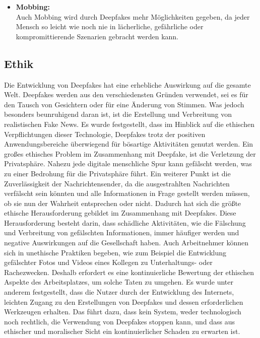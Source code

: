 \begin{itemize}
    \item \textbf{Mobbing:} \\
    Auch Mobbing wird durch Deepfakes mehr Möglichkeiten gegeben, da jeder Mensch so leicht wie noch nie in lächerliche, gefährliche oder kompromittierende Szenarien gebracht werden kann.\cite{ResearchGate}
\end{itemize}

\subsection{Ethik}

Die Entwicklung von Deepfakes hat eine erhebliche Auswirkung auf die gesamte Welt. Deepfakes werden aus den verschiedensten Gründen verwendet, sei es für den Tausch von Gesichtern oder für eine Änderung von Stimmen.\newline
Was jedoch besonders beunruhigend daran ist, ist die Erstellung und Verbreitung von realistischen Fake News. Es wurde festgestellt, dass im Hinblick auf die ethischen Verpflichtungen dieser Technologie, Deepfakes trotz der positiven Anwendungsbereiche überwiegend für bösartige Aktivitäten genutzt werden.\newline
Ein großes ethisches Problem im Zusammenhang mit Deepfake, ist die Verletzung der Privatsphäre. Nahezu jede digitale menschliche Spur kann gefälscht werden, was zu einer Bedrohung für die Privatsphäre führt. Ein weiterer Punkt ist die Zuverlässigkeit der Nachrichtensender, da die ausgestrahlten Nachrichten verfälscht sein könnten und alle Informationen in Frage gestellt werden müssen, ob sie nun der Wahrheit entsprechen oder nicht.\newline
Dadurch hat sich die größte ethische Herausforderung gebildet im Zusammenhang mit Deepfakes. Diese Herausforderung besteht darin, dass schädliche Aktivitäten, wie die Fälschung und Verbreitung von gefälschten Informationen, immer häufiger werden und negative Auswirkungen auf die Gesellschaft haben.\newline
Auch Arbeitnehmer können sich in unethische Praktiken begeben, wie zum Beispiel die Entwicklung gefälschter Fotos und Videos eines Kollegen zu Unterhaltungs- oder Rachezwecken. Deshalb erfordert es eine kontinuierliche Bewertung der ethischen Aspekte des Arbeitsplatzes, um solche Taten zu umgehen.
Es wurde unter anderem festgestellt, dass die Nutzer durch der Entwicklung des Internets, leichten Zugang zu den Erstellungen von Deepfakes und dessen erforderlichen Werkzeugen erhalten. Das führt dazu, dass kein System, weder technologisch noch rechtlich, die Verwendung von Deepfakes stoppen kann, und dass aus ethischer und moralischer Sicht ein kontinuierlicher Schaden zu erwarten ist.\cite{Jatit}